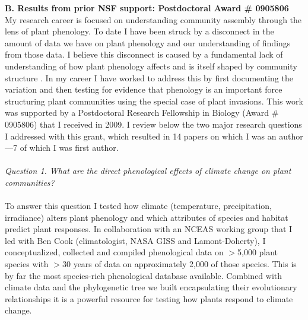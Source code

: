 \documentclass[12pt,a4paper,oneside]{article}
\begin{document}
\vspace{1ex}
{\bf B. Results from prior NSF support: Postdoctoral Award \# 0905806}
\vspace{1.5ex}\\
My research career is focused on understanding community assembly through the lens of plant phenology. To date I have been struck by a disconnect in the amount of data we have on plant phenology and our understanding of findings from those data. I believe this disconnect is caused by a fundamental lack of understanding of how plant phenology affects and is itself shaped by community structure \citep{tansley}. In my career I have worked to address this by first documenting the variation and then testing for evidence that phenology is an important force structuring plant communities using the special case of plant invasions. This work was supported by a Postdoctoral Research Fellowship in Biology (Award \# 0905806) that I received in 2009. I review below the two major research questions I addressed with this grant, which resulted in 14 papers on which I was an author---7 of which I was first author. \\
\vspace{-1ex}\\
\noindent \emph{Question 1. What are the direct phenological effects of climate change on plant communities?}\\
\vspace{-1ex}\\
\indent To answer this question  I tested how climate (temperature, precipitation, irradiance) alters plant phenology and which attributes of species and habitat predict plant responses. In collaboration with an NCEAS working group that I led with Ben Cook (climatologist, NASA GISS and Lamont-Doherty), I conceptualized, collected and compiled phenological data on \(>\)5,000 plant species with \(>\)30 years of data on approximately 2,000 of those species. This is by far the most species-rich phenological database available. Combined with climate data and the phylogenetic tree we built encapsulating their evolutionary relationships \citep{phentree} it is a powerful resource for testing how plants respond to climate change.
\vspace{1.5ex}\\
\end{document}

